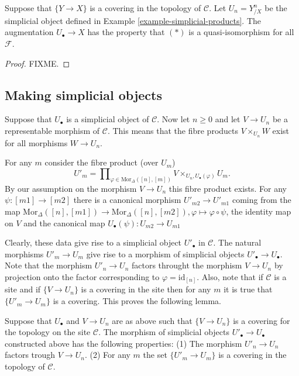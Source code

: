 \begin{lemma}
\label{lemma-product-hypercovering}
Suppose that $\{Y \to X\}$ is a covering in the topology of
$\mathcal{C}$. Let $U_n = Y^n_{/X}$ be the simplicial
object defined in Example \ref{example-simplicial-products}.
The augmentation $U_\bullet \to X$ has the property
that $(*)$ is a quasi-isomorphism for all $\mathcal{F}$.
\end{lemma}

\begin{proof}
FIXME.
\end{proof}

\subsection{Making simplicial objects}
\label{subsection-making-simplicial}

\noindent
Suppose that $U_\bullet$ is a simplicial object of $\mathcal{C}$. Now let
$n\geq 0$ and let $V \to U_n$ be a representable morphism of 
$\mathcal{C}$. This means that the fibre products $V \times_{U_n} W$ 
exist for all morphisms $W \to U_n$.

\smallskip\noindent
For any $m$ consider the fibre product (over $U_m$)
$$
U'_m = \prod\nolimits_{\varphi \in \text{Mor}_\Delta([n],[m])}
V\times_{U_n, U_\bullet(\varphi)} U_m.
$$
By our assumption on the morphism $V \to U_n$ this fibre product
exists. For any $\psi : [m1] \to [m2]$ there is a canonical morphism
$U'_{m2} \to U'_{m1}$ coming from the map $\text{Mor}_\Delta([n],[m1])
\to \text{Mor}_\Delta([n],[m2]), \varphi \mapsto \varphi \circ \psi$,
the identity map on $V$ and the canonical map $U_\bullet(\psi) : 
U_{m2} \to U_{m1}$

\smallskip\noindent
Clearly, these data give rise to a simplicial object $U'_\bullet$ in
$\mathcal{C}$. The natural morphisms $U'_m \to U_m$ give rise to a
morphism of simplicial objects $U'_\bullet \to U_\bullet$. Note that
the morphism $U'_n \to U_n$ factors throught the morphism $V \to U_n$
by projection onto the factor corresponding to $\varphi=\text{id}_{[n]}$.
Also, note that if $\mathcal{C}$ is a site and if 
$\{V \to U_n\}$ is a covering in the site then for any $m$ it is true
that $\{U'_m \to U_m\}$ is a covering. This proves the following lemma.

\begin{lemma}
\label{lemma-construct-new-covers}
Suppose that $U_\bullet$ and $V\to U_n$ are as above such that
$\{V \to U_n\}$ is a covering for the topology on the site
$\mathcal{C}$. The morphism of simplicial objects 
$U'_\bullet \to U_\bullet$ constructed above has the following 
properties:
(1) The morphism $U'_n \to U_n$ factors trough $V \to U_n$.
(2) For any $m$ the set $\{U'_m \to U_m\}$ is a covering
in the topology of $\mathcal{C}$.
\end{lemma}

